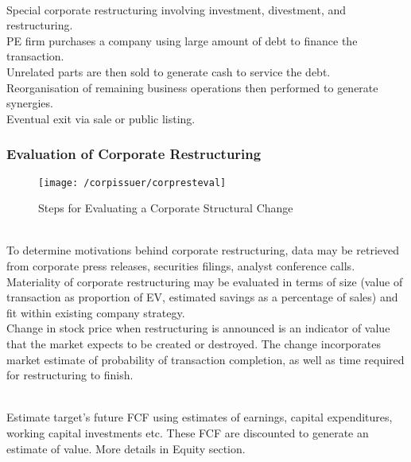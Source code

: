 \begin{remark} \\
Special corporate restructuring involving investment, divestment, and restructuring.\\
PE firm purchases a company using large amount of debt to finance the transaction.\\ 
Unrelated parts are then sold to generate cash to service the debt.\\
Reorganisation of remaining business operations then performed to generate synergies.\\
Eventual exit via sale or public listing.
\end{remark}

\subsubsection{Evaluation of Corporate Restructuring}

\begin{figure}[H]
\centering
\texttt{[image: /corpissuer/corpresteval]}
\caption{Steps for Evaluating a Corporate Structural Change}
\end{figure}

\begin{remark} \\
To determine motivations behind corporate restructuring, data may be retrieved from corporate press releases, securities filings, analyst conference calls.\\
Materiality of corporate restructuring may be evaluated in terms of size (value of transaction as proportion of EV, estimated savings as a percentage of sales) and fit within existing company strategy.\\
Change in stock price when restructuring is announced is an indicator of value that the market expects to be created or destroyed. The change incorporates market estimate of probability of transaction completion, as well as time required for restructuring to finish. 
\end{remark}

\begin{method} \\
Estimate target's future FCF using estimates of earnings, capital expenditures, working capital investments etc. These FCF are discounted to generate an estimate of value. More details in Equity section.
\end{method}

